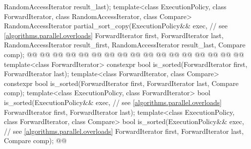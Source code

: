 \begin{codeblock}
{                        RandomAccessIterator result_last);
  template<class ExecutionPolicy, class ForwardIterator, class RandomAccessIterator,
           class Compare>
    RandomAccessIterator
      partial_sort_copy(ExecutionPolicy&& exec,  // see \ref{algorithms.parallel.overloads}
                        ForwardIterator first, ForwardIterator last,
                        RandomAccessIterator result_first,
                        RandomAccessIterator result_last,
                        Compare comp);
  @@
    @@
        @@
      @@
          @@
      @@
                           @@
    @@
        @@
      @@
          @@
          @@
            @@
      @@
        @@
                          @@
  @\added{\}}@
  template<class ForwardIterator>
    constexpr bool is_sorted(ForwardIterator first, ForwardIterator last);
  template<class ForwardIterator, class Compare>
    constexpr bool is_sorted(ForwardIterator first, ForwardIterator last,
                             Compare comp);
  template<class ExecutionPolicy, class ForwardIterator>
    bool is_sorted(ExecutionPolicy&& exec, // see \ref{algorithms.parallel.overloads}
                   ForwardIterator first, ForwardIterator last);
  template<class ExecutionPolicy, class ForwardIterator, class Compare>
    bool is_sorted(ExecutionPolicy&& exec, // see \ref{algorithms.parallel.overloads}
                   ForwardIterator first, ForwardIterator last,
                   Compare comp);
  @@
}
\end{codeblock}
